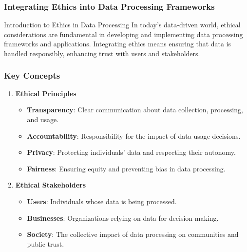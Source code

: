 \documentclass[aspectratio=169]{beamer}
\begin{document}
\begin{frame}[fragile]
    \frametitle{Integrating Ethics into Data Processing Frameworks}
    \begin{block}{Introduction to Ethics in Data Processing}
        In today's data-driven world, ethical considerations are fundamental in developing and implementing data processing frameworks and applications. Integrating ethics means ensuring that data is handled responsibly, enhancing trust with users and stakeholders.
    \end{block}
\end{frame}

\begin{frame}[fragile]
    \frametitle{Key Concepts}
    \begin{enumerate}
        \item \textbf{Ethical Principles}
            \begin{itemize}
                \item \textbf{Transparency}: Clear communication about data collection, processing, and usage.
                \item \textbf{Accountability}: Responsibility for the impact of data usage decisions.
                \item \textbf{Privacy}: Protecting individuals' data and respecting their autonomy.
                \item \textbf{Fairness}: Ensuring equity and preventing bias in data processing.
            \end{itemize}
        \item \textbf{Ethical Stakeholders}
            \begin{itemize}
                \item \textbf{Users}: Individuals whose data is being processed.
                \item \textbf{Businesses}: Organizations relying on data for decision-making.
                \item \textbf{Society}: The collective impact of data processing on communities and public trust.
            \end{itemize}
    \end{enumerate}
\end{frame}
\end{document}

